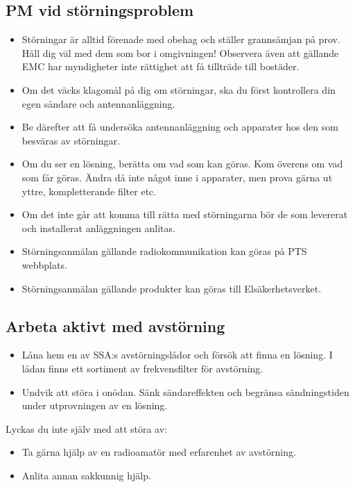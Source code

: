 \subsection{PM vid störningsproblem}

\begin{itemize}
	\item Störningar är alltid förenade med obehag och ställer grannsämjan på prov.
	Håll dig väl med dem som bor i omgivningen! Observera även att gällande EMC
	har myndigheter inte rättighet att få tillträde till bostäder.
	\item Om det väcks klagomål på dig om störningar, ska du först
	kontrollera din egen sändare och antennanläggning.
	\item Be därefter att få undersöka antennanläggning och apparater hos
	den som besväras av störningar.
	\item Om du ser en lösning, berätta om vad som kan göras.
	Kom överens om vad som får göras.
	Ändra då inte något inne i apparater, men prova gärna ut yttre,
	kompletterande filter etc.
	\item Om det inte går att komma till rätta med störningarna bör de som
	levererat och installerat anläggningen anlitas.
	\item Störningsanmälan gällande radiokommunikation kan göras på PTS webbplats.
	\item Störningsanmälan gällande produkter kan göras till Elsäkerhetsverket.
\end{itemize}

\subsection{Arbeta aktivt med avstörning}

\begin{itemize}
	\item Låna hem en av SSA:s avstörningslådor och försök att finna en lösning.
	I lådan finns ett sortiment av frekvensfilter för avstörning.
	\item Undvik att störa i onödan.
	Sänk sändareffekten och begränsa sändningstiden under utprovningen av en
	lösning.
\end{itemize}
Lyckas du inte själv med att störa av:
\begin{itemize}
	\item Ta gärna hjälp av en radioamatör med erfarenhet av avstörning.
	\item Anlita annan sakkunnig hjälp.
\end{itemize}
